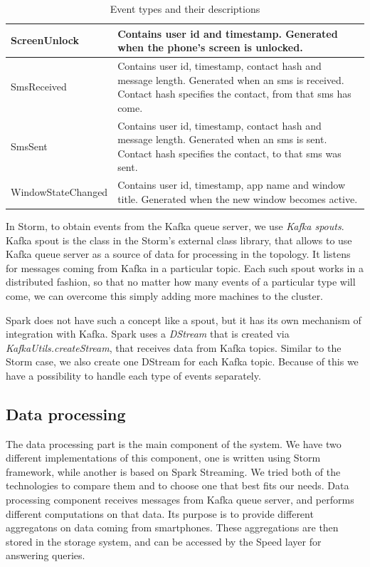 \begin{table}[h]
\begin{tabular}{ | l | p{10cm} |}
    ScreenUnlock & Contains user id and timestamp. Generated when the phone's screen is unlocked. \\ \hline
    SmsReceived & Contains user id,  timestamp, contact hash and message length. Generated when an sms is received. Contact hash specifies the contact, from that sms has come. \\ \hline
    SmsSent & Contains user id,  timestamp, contact hash and message length. Generated when an sms is sent. Contact hash specifies the contact, to that sms was sent. \\ \hline
    WindowStateChanged & Contains user id, timestamp, app name and window title. Generated when the new window becomes active. \\
    \hline
\end{tabular}
\caption{Event types and their descriptions}
\label{table:event_types}
\end{table}

In Storm, to obtain events from the Kafka queue server, we use \textit{Kafka spouts}.
Kafka spout is the class in the Storm's external class library, that allows to use Kafka queue server as a source of data for processing in the topology.
It listens for messages coming from Kafka in a particular topic.
Each such spout works in a distributed fashion, so that no matter how many events of a particular type will come, we can overcome this simply adding more machines to the cluster.

Spark does not have such a concept like a spout, but it has its own mechanism of integration with Kafka.
Spark uses a \textit{DStream} that is created via \textit{KafkaUtils.createStream}, that receives data from Kafka topics.
Similar to the Storm case, we also create one DStream for each Kafka topic.
Because of this we have a possibility to handle each type of events separately.

\subsection{Data processing}

The data processing part is the main component of the system.
We have two different implementations of this component, one is written using Storm framework, while another is based on Spark Streaming.
We tried both of the technologies to compare them and to choose one that best fits our needs.
Data processing component receives messages from Kafka queue server, and performs different computations on that data.
Its purpose is to provide different aggregatons on data coming from smartphones.
These aggregations are then stored in the storage system, and can be accessed by the Speed layer for answering queries.

